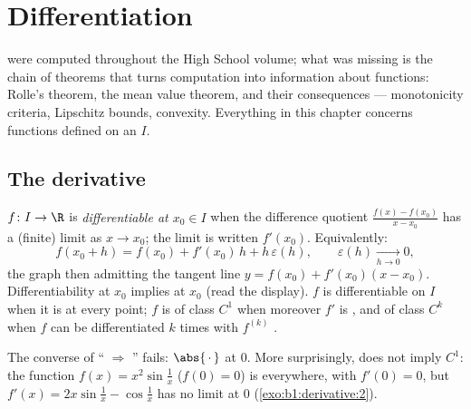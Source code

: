 \chapter{Differentiation}\label{ch:b1:derivative}

 were computed throughout the High School volume; what was
missing is the chain of theorems that turns computation into
information about functions: Rolle's theorem, the mean value theorem,
and their consequences --- monotonicity criteria, Lipschitz bounds,
convexity. Everything in this chapter concerns functions defined on
an  $I$.

\section{The derivative}

\begin{definition}\label{def:b1:derivative:def}
$f \colon I \to \R$ is \emph{differentiable at $x_0 \in
I$} when the difference quotient
$\frac{f(x) - f(x_0)}{x - x_0}$ has a (finite) limit as $x \to x_0$;
the limit is written $f'(x_0)$. Equivalently:
\[
f(x_0 + h) = f(x_0) + f'(x_0)\,h + h\,\varepsilon(h),
\qquad \varepsilon(h) \xrightarrow[h \to 0]{} 0 ,
\]
the graph then admitting the tangent line $y = f(x_0) + f'(x_0)(x -
x_0)$. Differentiability at $x_0$ implies  at $x_0$ (read
the display). $f$ is differentiable on $I$ when it is at every point;
$f$ is of class $C^1$ when moreover $f'$ is , and of
class $C^k$ when $f$ can be
differentiated $k$ times with $f^{(k)}$ .
\end{definition}

\begin{example}\label{ex:b1:derivative:notc1}
The converse of `` $\Rightarrow$ '' fails:
$\abs{\,\cdot\,}$ at $0$. More surprisingly,  does not
imply $C^1$: the function $f(x) = x^2 \sin\frac 1x$ ($f(0) = 0$) is
 everywhere, with $f'(0) = 0$, but $f'(x) = 2x
\sin\frac1x - \cos\frac 1x$ has no limit at $0$
(\cref{exo:b1:derivative:2}).
\end{example}

